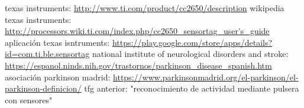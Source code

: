 \begin{thebibliography}{15}
     texas instruments: \url {http://www.ti.com/product/cc2650/description}
     wikipedia texas instruments: \url {http://processors.wiki.ti.com/index.php/cc2650\_sensortag\_user's\_guide}
     aplicación texas isntruments: \url {https://play.google.com/store/apps/details?id=com.ti.ble.sensortag}
     national institute of neurological disorders and stroke: \url{https://espanol.ninds.nih.gov/trastornos/parkinson_disease_spanish.htm}
     asociación parkinson madrid: \url{https://www.parkinsonmadrid.org/el-parkinson/el-parkinson-definicion/}
     tfg anterior: "reconocimiento de actividad mediante pulsera con sensores"
\end{thebibliography}

